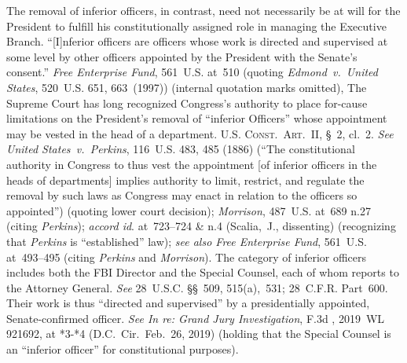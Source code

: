 The removal of inferior officers, in contrast, need not necessarily be at will for the President to fulfill his constitutionally assigned role in managing the Executive Branch.
``[I]nferior officers are officers whose work is directed and supervised at some level by other officers appointed by the President with the Senate's consent.''
\textit{Free Enterprise Fund}, 561~U.S. at~510 (quoting \textit{Edmond~v.\ United States}, 520~U.S. 651, 663~(1997)) (internal quotation marks omitted), The Supreme Court has long recognized Congress's authority to place for-cause limitations on the President's removal of ``inferior Officers'' whose appointment may be vested in the head of a department.
\textsc{U.S. Const.\ Art.~II}, \S~2, cl.~2.
\textit{See United States~v.\ Perkins}, 116~U.S. 483, 485 (1886) (``The constitutional authority in Congress to thus vest the appointment [of inferior officers in the heads of departments] implies authority to limit, restrict, and regulate the removal by such laws as Congress may enact in relation to the officers so appointed'') (quoting lower court decision);
\textit{Morrison}, 487~U.S. at~689 n.27 (citing \textit{Perkins});
\textit{accord id}. at~723--724 \& n.4 (Scalia,~J., dissenting) (recognizing that \textit{Perkins} is ``established'' law);
\textit{see also Free Enterprise Fund}, 561~U.S. at~493--495 (citing \textit{Perkins} and \textit{Morrison}).
The category of inferior officers includes both the FBI Director and the Special Counsel, each of whom reports to the Attorney General.
\textit{See} 28~U.S.C. \S\S~509, 515(a),~531; 28~C.F.R. Part~600.
Their work is thus ``directed and supervised'' by a presidentially appointed, Senate-confirmed officer.
\textit{See In re: Grand Jury Investigation}, \textunderscore\textunderscore F.3d \textunderscore\textunderscore, 2019~WL 921692, at *3-*4 (D.C.~Cir.\ Feb.~26, 2019) (holding that the Special Counsel is an ``inferior officer'' for constitutional purposes).

